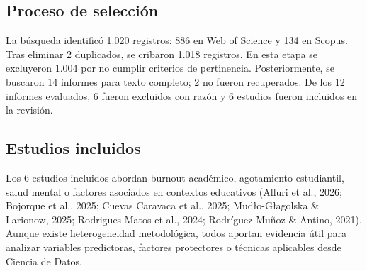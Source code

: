 \documentclass[12pt,a4paper]{article}
\begin{document}
\subsection{Proceso de selección}

La búsqueda identificó 1.020 registros: 886 en Web of Science y 134 en Scopus. Tras eliminar 2 duplicados, se cribaron 1.018 registros. En esta etapa se excluyeron 1.004 por no cumplir criterios de pertinencia. Posteriormente, se buscaron 14 informes para texto completo; 2 no fueron recuperados. De los 12 informes evaluados, 6 fueron excluidos con razón y 6 estudios fueron incluidos en la revisión.

\subsection{Estudios incluidos}

Los 6 estudios incluidos abordan burnout académico, agotamiento estudiantil, salud mental o factores asociados en contextos educativos (Alluri et al., 2026; Bojorque et al., 2025; Cuevas Caravaca et al., 2025; Mud\l{}o-G\l{}agolska \& Larionow, 2025; Rodrigues Matos et al., 2024; Rodríguez Muñoz \& Antino, 2021). Aunque existe heterogeneidad metodológica, todos aportan evidencia útil para analizar variables predictoras, factores protectores o técnicas aplicables desde Ciencia de Datos.
\end{document}
